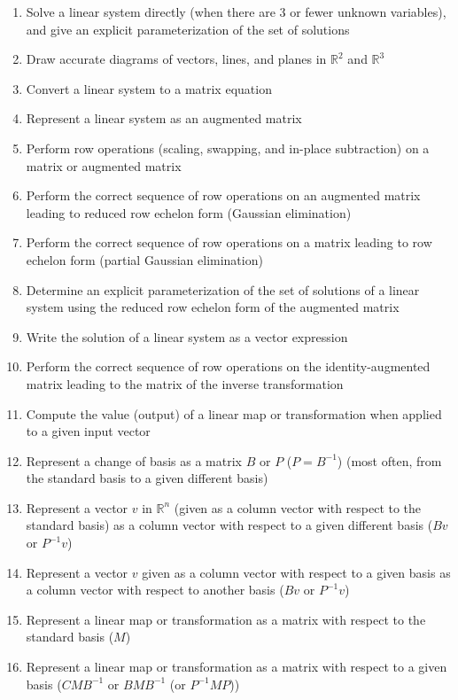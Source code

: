 \documentclass[10pt]{article}
\begin{document}
\setlength\parindent{0pt}
\begin{enumerate}
\itemsep0em
\item{Solve a linear system directly (when there are 3 or fewer unknown variables), and give an explicit parameterization of the set of solutions}
\item{Draw accurate diagrams of vectors, lines, and planes in $\mathbb{R}^2$ and $\mathbb{R}^3$}
\item{Convert a linear system to a matrix equation}
\item{Represent a linear system as an augmented matrix}
\item{Perform row operations (scaling, swapping, and in-place subtraction) on a matrix or augmented matrix}
\item{Perform the correct sequence of row operations on an augmented matrix leading to reduced row echelon form (Gaussian elimination)}
\item{Perform the correct sequence of row operations on a matrix leading to row echelon form (partial Gaussian elimination)}
\item{Determine an explicit parameterization of the set of solutions of a linear system using the reduced row echelon form of the augmented matrix}
\item{Write the solution of a linear system as a vector expression}
\item{Perform the correct sequence of row operations on the identity-augmented matrix leading to the matrix of the inverse transformation}
\item{Compute the value (output) of a linear map or transformation when applied to a given input vector}
\item{Represent a change of basis as a matrix $B$ or $P$ ($P=B^{-1}$) (most often, from the standard basis to a given different basis)}
\item{Represent a vector $v$ in $\mathbb{R}^n$ (given as a column vector with respect to the standard basis) as a column vector with respect to a given different basis ($Bv$ or $P^{-1}v$)}
\item{Represent a vector $v$ given as a column vector with respect to a given basis as a column vector with respect to another basis ($Bv$ or $P^{-1}v$)}
\item{Represent a linear map or transformation as a matrix with respect to the standard basis ($M$)}
\item{Represent a linear map or transformation as a matrix with respect to a given basis ($CMB^{-1}$ or $BMB^{-1}$ (or $P^{-1}MP$))}

\end{enumerate}
\end{document}
